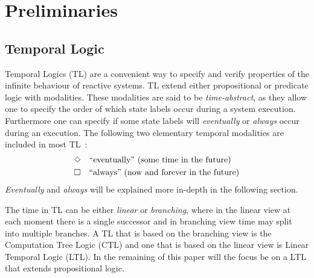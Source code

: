 \section{Preliminaries}

\subsection{Temporal Logic}
Temporal Logics (TL) are a convenient way to specify and verify properties of the infinite behaviour of reactive systems. TL extend either propositional or predicate logic with modalities. These modalities are said to be \emph{time-abstract}, as they allow one to specify the order of which state labels occur during a system execution. Furthermore one can specify if some state labels will \emph{eventually} or \emph{always} occur during an execution. The following two elementary temporal modalities are included in most TL~\cite{baier2008principles}:
\begin{align*}
    &\Diamond \quad \text{``eventually'' (some time in the future)}\\
    &\square \quad \text{``always'' (now and forever in the future)}
\end{align*}
\emph{Eventually} and \emph{always} will be explained more in-depth in the following section. 

The time in TL can be either \emph{linear} or \emph{branching}, where in the linear view at each moment there is a single successor and in branching view time may split into multiple branches. A TL that is based on the branching view is the Computation Tree Logic (CTL) and one that is based on the linear view is Linear Temporal Logic (LTL). In the remaining of this paper will the focus be on a LTL that extends propositional logic.

